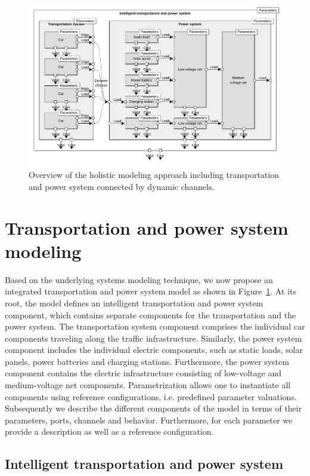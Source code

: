 \begin{figure}[b]
	\centering
	\includegraphics[width=\textwidth]{../gfx/model.pdf}
	\caption{Overview of the holistic modeling approach including transportation and power system connected by dynamic channels.}
	\label{fig:model}
\end{figure}

\section{Transportation and power system modeling}
\label{section:contribution}

Based on the underlying systems modeling technique, we now propose an integrated transportation and power system model as shown in Figure~\ref{fig:model}. At its root, the model defines an intelligent transportation and power system component, which contains separate components for the transportation and the power system. The transportation system component comprises the individual car components traveling along the traffic infrastructure. Similarly, the power system component includes the individual electric components, such as static loads, solar panels, power batteries and charging stations. Furthermore, the power system component contains the electric infrastructure consisting of low-voltage and medium-voltage net components. Parametrization allows one to instantiate all components using reference configurations, i.e. predefined parameter valuations. Subsequently we describe the different components of the model in terms of their parameters, ports, channels and behavior. Furthermore, for each parameter we provide a description as well as a reference configuration.

\subsection{Intelligent transportation and power system}

